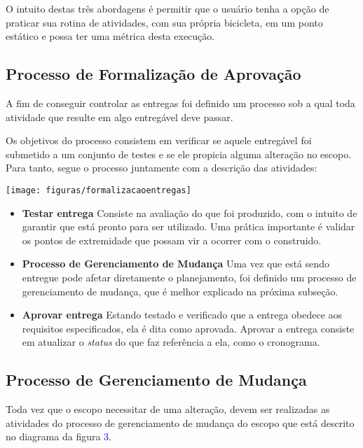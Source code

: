 O intuito destas três abordagens é permitir que o usuário tenha a opção de praticar sua rotina de atividades, com sua própria bicicleta, em um ponto estático e possa ter uma métrica desta execução.

\subsection{Processo de Formalização de Aprovação}

A fim de conseguir controlar as entregas foi definido um processo sob a qual toda atividade que resulte em algo entregável deve passar. 

Os objetivos do processo consistem em verificar se aquele entregável foi submetido a um conjunto de testes e se ele propicia alguma alteração no escopo. Para tanto, segue o processo juntamente com a descrição das atividades:

 \begin{center}
	\texttt{[image: figuras/formalizacaoentregas]}
\end{center} 

\begin{itemize}
\item \textbf{Testar entrega}
Consiste na avaliação do que foi produzido, com o intuito de garantir que está pronto para ser utilizado. Uma prática importante é validar os pontos de extremidade que possam vir a ocorrer com o construido.

\item \textbf{Processo de Gerenciamento de Mudança}
Uma vez que está sendo entregue pode afetar diretamente o planejamento, foi definido um processo de gerenciamento de mudança, que é melhor explicado na próxima subseção.

\item \textbf{Aprovar entrega}
Estando testado e verificado que a entrega obedece aos requisitos especificados, ela é dita como aprovada. Aprovar a entrega consiste em atualizar o \textit{status} do que faz referência a ela, como o cronograma. 
\end{itemize}

\subsection{Processo de Gerenciamento de Mudança}

Toda vez que o escopo necessitar de uma alteração, devem ser realizadas as atividades do processo de gerenciamento de mudança do escopo que está descrito no diagrama da figura \textcolor{blue}{3}.

